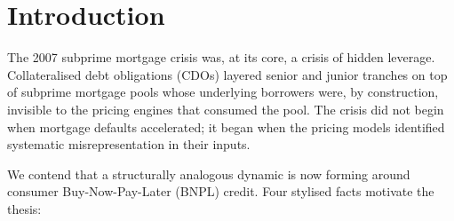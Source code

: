 \documentclass[11pt,letterpaper]{article}
\begin{document}
\begin{abstract}
A full public retrospective on the v1 draft of this work --- which
made stronger claims under different framing and which has been
superseded --- is committed to the project repository at
\texttt{docs/v1\_retrospective.md}. A sealed alternative abstract
covering the case in which the origination-residual scorer kills
the catalyst-event signal is committed at
\texttt{docs/alt\_abstract\_sealed.md}. Both documents are part of
the official record of this submission.

All code, data, and figures are reproducible from a single
DuckDB warehouse via \texttt{make paper-formal}.

\vspace{0.4em}
\noindent\textbf{Keywords.} Behavioral sensor, consumer credit,
BNPL, CFPB complaint data, construct validity, falsification, local
projection, origination residual, pre-registration, sentiment.

\vspace{0.2em}
\noindent\textbf{JEL codes.} G12, G17, G23, G28, G51.
\end{abstract}


\section{Introduction}
\label{sec:intro}

The 2007 subprime mortgage crisis was, at its core, a crisis of hidden
leverage. Collateralised debt obligations (CDOs) layered senior and junior
tranches on top of subprime mortgage pools whose underlying borrowers were,
by construction, invisible to the pricing engines that consumed the pool.
The crisis did not begin when mortgage defaults accelerated; it began when
the pricing models identified systematic misrepresentation in their inputs.

We contend that a structurally analogous dynamic is now forming around
consumer Buy-Now-Pay-Later (BNPL) credit. Four stylised facts motivate the
thesis:
\end{document}
